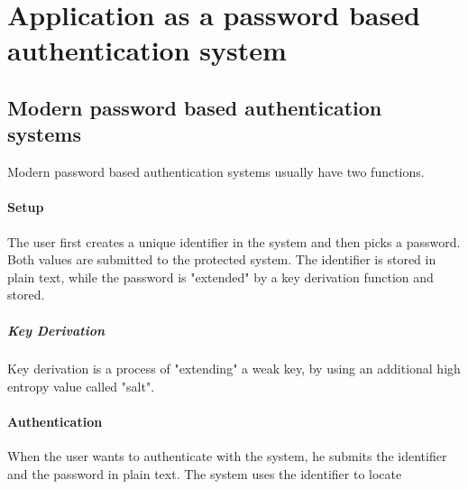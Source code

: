 \section{Application as a password based authentication system}

\subsection{Modern password based authentication systems}
Modern password based authentication systems usually have two functions.

\paragraph{Setup}
The user first creates a unique identifier in the system and then picks a password. 
Both values are submitted to the protected system. The identifier is stored in plain text, while the password is "extended" by a key derivation function and stored.

\subparagraph{Key Derivation}
Key derivation is a process of "extending" a weak key, by using an additional high entropy value called "salt".

\paragraph{Authentication}
When the user wants to authenticate with the system, he submits the identifier and the password in plain text.
The system uses the identifier to locate 